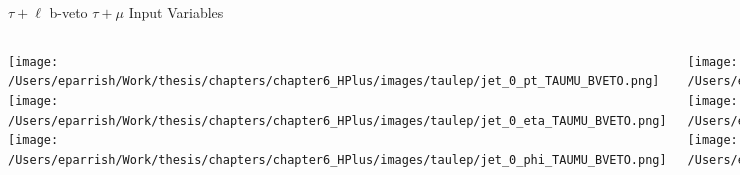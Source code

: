 \documentclass[aspectratio=169,xcolor=table]{beamer}
\begin{document}
    \begin{frame}[t]{$\tau+\ell$ b-veto $\tau+\mu$ Input Variables}
      \begin{columns}[t]
          \texttt{[image: /Users/eparrish/Work/thesis/chapters/chapter6\_HPlus/images/taulep/jet\_0\_pt\_TAUMU\_BVETO.png]}
          \texttt{[image: /Users/eparrish/Work/thesis/chapters/chapter6\_HPlus/images/taulep/jet\_0\_eta\_TAUMU\_BVETO.png]}
          \texttt{[image: /Users/eparrish/Work/thesis/chapters/chapter6\_HPlus/images/taulep/jet\_0\_phi\_TAUMU\_BVETO.png]}

          \texttt{[image: /Users/eparrish/Work/thesis/chapters/chapter6\_HPlus/images/taulep/lep\_0\_pt\_TAUMU\_BVETO.png]}
          \texttt{[image: /Users/eparrish/Work/thesis/chapters/chapter6\_HPlus/images/taulep/lep\_0\_eta\_TAUMU\_BVETO.png]}
          \texttt{[image: /Users/eparrish/Work/thesis/chapters/chapter6\_HPlus/images/taulep/lep\_0\_phi\_TAUMU\_BVETO.png]}

          \texttt{[image: /Users/eparrish/Work/thesis/chapters/chapter6\_HPlus/images/taulep/el\_0\_pt\_TAUMU\_BVETO.png]}
          \texttt{[image: /Users/eparrish/Work/thesis/chapters/chapter6\_HPlus/images/taulep/el\_0\_eta\_TAUMU\_BVETO.png]}
          \texttt{[image: /Users/eparrish/Work/thesis/chapters/chapter6\_HPlus/images/taulep/el\_0\_phi\_TAUMU\_BVETO.png]}

          \texttt{[image: /Users/eparrish/Work/thesis/chapters/chapter6\_HPlus/images/taulep/mu\_0\_pt\_TAUMU\_BVETO.png]}
          \texttt{[image: /Users/eparrish/Work/thesis/chapters/chapter6\_HPlus/images/taulep/mu\_0\_eta\_TAUMU\_BVETO.png]}
          \texttt{[image: /Users/eparrish/Work/thesis/chapters/chapter6\_HPlus/images/taulep/mu\_0\_phi\_TAUMU\_BVETO.png]}

      \end{columns}
    \end{frame}
\end{document}

